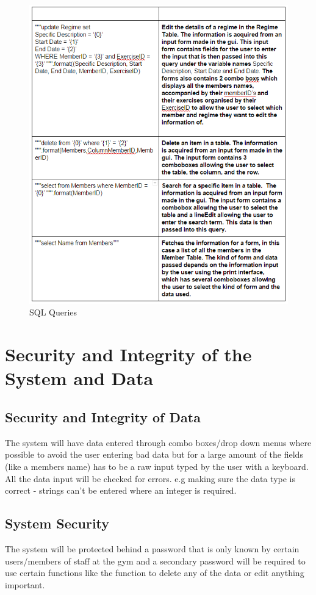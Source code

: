 \begin{itemize}
\begin{figure}[H]
    \includegraphics[width=\textwidth]{Queries3.PNG}
    \caption{SQL Queries} \label{fig:SQL Queries}
\end{figure}

\section{Security and Integrity of the System and Data}

\subsection{Security and Integrity of Data}
The system will have data entered through combo boxes/drop down menus where possible to avoid the user entering bad data but for a large amount of the fields (like a members name) has to be a raw input typed by the user with a keyboard. All the data input will be checked for errors. e.g making sure the data type is correct - strings can't be entered where an integer is required. 

\subsection{System Security}
The system will be protected behind a password that is only known by certain users/members of staff at the gym and a secondary password will be required to use certain functions like the function to delete any of the data or edit anything important.


\end{itemize}
